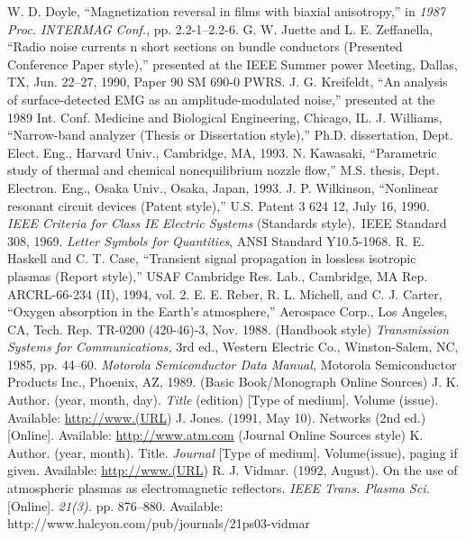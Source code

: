 \documentclass[transmag]{IEEEtran}
\begin{document}
\begin{thebibliography}{00}
 W. D. Doyle, ``Magnetization reversal in films with biaxial anisotropy,'' in \emph{1987 Proc. INTERMAG Conf.}, pp. 2.2-1--2.2-6.
 G. W. Juette and L. E. Zeffanella, ``Radio noise currents n short sections on bundle conductors (Presented Conference Paper style),'' presented at the IEEE Summer power Meeting, Dallas, TX, Jun. 22--27, 1990, Paper 90 SM 690-0 PWRS.
 J. G. Kreifeldt, ``An analysis of surface-detected EMG as an amplitude-modulated noise,'' presented at the 1989 Int. Conf. Medicine and Biological Engineering, Chicago, IL.
 J. Williams, ``Narrow-band analyzer (Thesis or Dissertation style),'' Ph.D. dissertation, Dept. Elect. Eng., Harvard Univ., Cambridge, MA, 1993. 
 N. Kawasaki, ``Parametric study of thermal and chemical nonequilibrium nozzle flow,'' M.S. thesis, Dept. Electron. Eng., Osaka Univ., Osaka, Japan, 1993.
 J. P. Wilkinson, ``Nonlinear resonant circuit devices (Patent style),'' U.S. Patent 3 624 12, July 16, 1990. 
 \emph{IEEE Criteria for Class IE Electric Systems} (Standards style)$,$ IEEE Standard 308, 1969.
 \emph{Letter Symbols for Quantities}, ANSI Standard Y10.5-1968.
 R. E. Haskell and C. T. Case, ``Transient signal propagation in lossless isotropic plasmas (Report style),'' USAF Cambridge Res. Lab., Cambridge, MA Rep. ARCRL-66-234 (II), 1994, vol. 2.
 E. E. Reber, R. L. Michell, and C. J. Carter, ``Oxygen absorption in the Earth's atmosphere,'' Aerospace Corp., Los Angeles, CA, Tech. Rep. TR-0200 (420-46)-3, Nov. 1988.
 (Handbook style) \emph{Transmission Systems for Communications,} 3rd ed., Western Electric Co., Winston-Salem, NC, 1985, pp. 44--60.
 \emph{Motorola Semiconductor Data Manual,} Motorola Semiconductor Products Inc., Phoenix, AZ, 1989.
 (Basic Book/Monograph Online Sources) J. K. Author. (year, month, day). \emph{Title} (edition) [Type of medium]. Volume (issue). Available: \underline {http://www.(URL})
 J. Jones. (1991, May 10). Networks (2nd ed.) [Online]. Available: \underline {http://www.atm.com}
 (Journal Online Sources style) K. Author. (year, month). Title. \emph{Journal} [Type of medium]. Volume(issue), paging if given. Available: \underline {http://www.(URL})
 R. J. Vidmar. (1992, August). On the use of atmospheric plasmas as electromagnetic reflectors. \emph{IEEE Trans. Plasma Sci.} [Online]. \emph{21(3).} pp. 876--880. Available: http://www.halcyon.com/pub/journals/21ps03-vidmar
\end{thebibliography}



\clearpage
\newpage


\appendix
\label{appendix-A}




\end{document}
